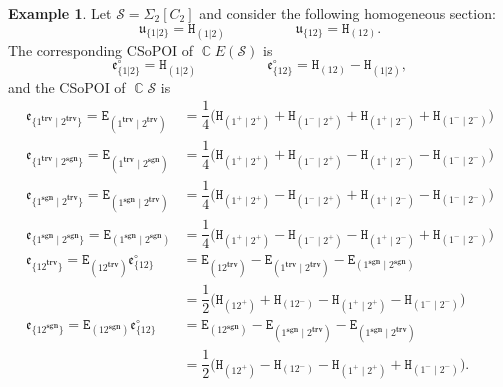 \documentclass[11pt, oneside, reqno]{amsart}
\theoremstyle{definition}
\newtheorem{example}[theorem]{Example}
\numberwithin{equation}{section}
\DeclareMathOperator{\C}{\mathbb{C}}
\def \SS{{\mathcal{S}}}
\def \kk{\C}
\def \uu{{\mathfrak{u}}}
\def \ee{{\mathfrak{e}}}
\def \sgn{\mathbf{sgn}}
\def \trv{\mathbf{trv}}
\newcommand{\B}[1]{\mathtt{#1}} 			%
\begin{document}
\begin{example}
    Let $\SS = \Sigma_2[C_2]$ and consider the following homogeneous section:
    \[
        \uu_{\{1|2\}} = \B{H}_{(1|2)}
        \hspace{5em}
        \uu_{\{12\}} = \B{H}_{(12)}.
    \]
    The corresponding CSoPOI of $\kk E(\SS)$ is
    \[
        \ee^\circ_{\{1|2\}} = \B{H}_{(1|2)}
        \hspace{5em}
        \ee^\circ_{\{12\}} = \B{H}_{(12)} - \B{H}_{(1|2)},
    \]
    and the CSoPOI of $\kk \SS$ is
    \begin{align*}
        \ee_{\{ 1^{\trv} \mid 2^{\trv} \}} =
        \B{E}_{( 1^{\trv} \mid 2^{\trv} )} & =
                    \dfrac{1}{4} \Big( \B{H}_{(1^+ \mid 2^+)} + \B{H}_{(1^- \mid 2^+)} + \B{H}_{(1^+ \mid 2^-)} + \B{H}_{(1^- \mid 2^-)} \Big) \\
        \ee_{\{ 1^{\trv} \mid 2^{\sgn} \}} =
        \B{E}_{( 1^{\trv} \mid 2^{\sgn} )} & =
                    \dfrac{1}{4} \Big( \B{H}_{(1^+ \mid 2^+)} + \B{H}_{(1^- \mid 2^+)} - \B{H}_{(1^+ \mid 2^-)} - \B{H}_{(1^- \mid 2^-)} \Big) \\
        \ee_{\{ 1^{\sgn} \mid 2^{\trv} \}} =
        \B{E}_{( 1^{\sgn} \mid 2^{\trv} )} & =
                    \dfrac{1}{4} \Big( \B{H}_{(1^+ \mid 2^+)} - \B{H}_{(1^- \mid 2^+)} + \B{H}_{(1^+ \mid 2^-)} - \B{H}_{(1^- \mid 2^-)} \Big) \\
        \ee_{\{ 1^{\sgn} \mid 2^{\sgn} \}} =
        \B{E}_{( 1^{\sgn} \mid 2^{\sgn} )} & =
                    \dfrac{1}{4} \Big( \B{H}_{(1^+ \mid 2^+)} - \B{H}_{(1^- \mid 2^+)} - \B{H}_{(1^+ \mid 2^-)} + \B{H}_{(1^- \mid 2^-)} \Big)  \\
        \ee_{\{ 12^{\trv} \}} =
        \B{E}_{( 12^{\trv} )} \ee^\circ_{\{12\}} & =
                    \B{E}_{( 12^{\trv} )} - \B{E}_{( 1^{\trv} \mid 2^{\trv} )} - \B{E}_{( 1^{\sgn} \mid 2^{\sgn} )} \\ & =
                    \dfrac{1}{2} \Big( \B{H}_{(12^+)} + \B{H}_{(12^-)} - \B{H}_{(1^+ \mid 2^+)} - \B{H}_{(1^- \mid 2^-)} \Big)  \\   
        \ee_{\{ 12^{\sgn} \}} =
        \B{E}_{( 12^{\sgn} )} \ee^\circ_{\{12\}} & =
                    \B{E}_{( 12^{\sgn} )} - \B{E}_{( 1^{\sgn} \mid 2^{\trv} )} - \B{E}_{( 1^{\sgn} \mid 2^{\trv} )} \\ & =
                    \dfrac{1}{2} \Big( \B{H}_{(12^+)} - \B{H}_{(12^-)} - \B{H}_{(1^+ \mid 2^+)} + \B{H}_{(1^- \mid 2^-)} \Big).
    \end{align*}
\end{example}
\end{document}
